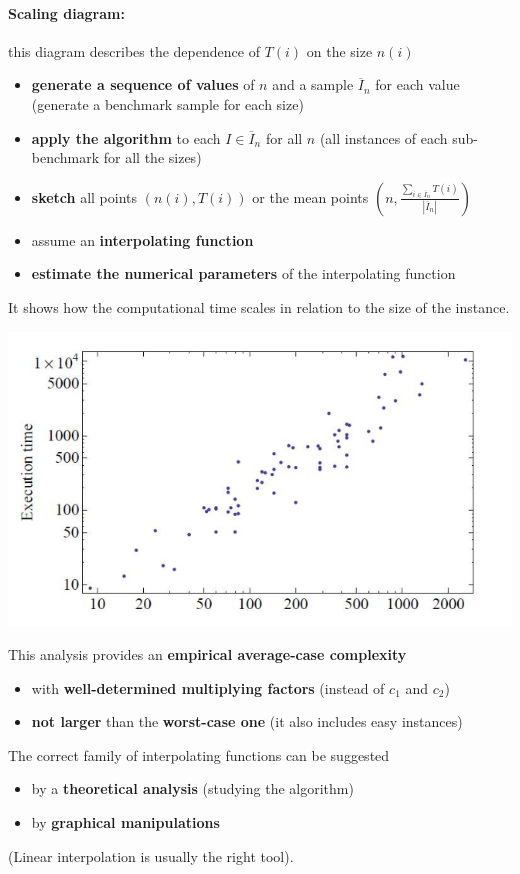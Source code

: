 \newpage

\paragraph{Scaling diagram:} this diagram describes the dependence of $T (i )$ on the size $n (i )$
\begin{itemize}
	\item \textbf{generate a sequence of values} of $n$ and a sample $\overline{I}_n$ for each value (generate a benchmark sample for each size)
	\item \textbf{apply the algorithm} to each $I \in \overline{I}_n$ for all $n$ (all instances of each sub-benchmark for all the sizes)
	\item \textbf{sketch} all points $(n (i ) , T (i ))$ or the mean points $\left(n, \frac{\sum_{i \in \overline{I}_n} T(i)}{|\overline{I}_n|}\right)$ 
	\item assume an \textbf{interpolating function}
	\item \textbf{estimate the numerical parameters} of the interpolating function
\end{itemize}
It shows how the computational time scales in relation to the size of the instance.
\begin{center}
	\includegraphics[width=0.7\columnwidth]{img/SD1}
\end{center}
This analysis provides an \textbf{empirical average-case complexity}
\begin{itemize}
	\item with \textbf{well-determined multiplying factors} (instead of $c_1$ and $c_2$)
	\item \textbf{not larger} than the \textbf{worst-case one} (it also includes easy instances)
\end{itemize}

\newpage

The correct family of interpolating functions can be suggested
\begin{itemize}
	\item by a \textbf{theoretical analysis} (studying the algorithm)
	\item by \textbf{graphical manipulations}
\end{itemize}
(Linear interpolation is usually the right tool).\\

